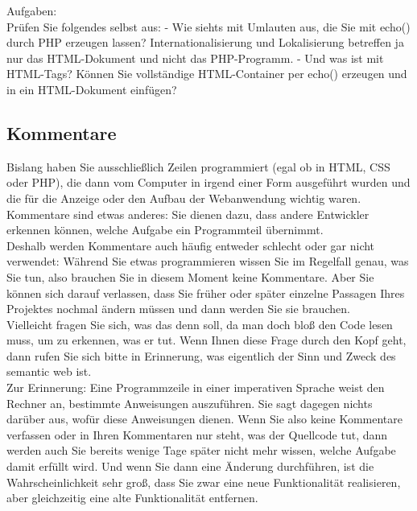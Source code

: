 Aufgaben: \\

Prüfen Sie folgendes selbst aus:
-	Wie siehts mit Umlauten aus, die Sie mit echo() durch PHP erzeugen lassen? Internationalisierung und Lokalisierung betreffen ja nur das HTML-Dokument und nicht das PHP-Programm.
-	Und was ist mit HTML-Tags? Können Sie vollständige HTML-Container per echo() erzeugen und in ein HTML-Dokument einfügen?

\subsection{Kommentare}

Bislang haben Sie ausschließlich Zeilen programmiert (egal ob in HTML, CSS oder PHP), die dann vom Computer in irgend einer Form ausgeführt wurden und die für die Anzeige oder den Aufbau der Webanwendung wichtig waren. Kommentare sind etwas anderes: Sie dienen dazu, dass andere Entwickler erkennen können, welche Aufgabe ein Programmteil übernimmt.\\

Deshalb werden Kommentare auch häufig entweder schlecht oder gar nicht verwendet: Während Sie etwas programmieren wissen Sie im Regelfall genau, was Sie tun, also brauchen Sie in diesem Moment keine Kommentare. Aber Sie können sich darauf verlassen, dass Sie früher oder später einzelne Passagen Ihres Projektes nochmal ändern müssen und dann werden Sie sie brauchen.\\

Vielleicht fragen Sie sich, was das denn soll, da man doch bloß den Code lesen muss, um zu erkennen, was er tut. Wenn Ihnen diese Frage durch den Kopf geht, dann rufen Sie sich bitte in Erinnerung, was eigentlich der Sinn und Zweck des semantic web ist.\\

Zur Erinnerung: Eine Programmzeile in einer imperativen Sprache weist den Rechner an, bestimmte Anweisungen auszuführen. Sie sagt dagegen nichts darüber aus, wofür diese Anweisungen dienen. Wenn Sie also keine Kommentare verfassen oder in Ihren Kommentaren nur steht, was der Quellcode tut, dann werden auch Sie bereits wenige Tage später nicht mehr wissen, welche Aufgabe damit erfüllt wird. Und wenn Sie dann eine Änderung durchführen, ist die Wahrscheinlichkeit sehr groß, dass Sie zwar eine neue Funktionalität realisieren, aber gleichzeitig eine alte Funktionalität entfernen.\\

